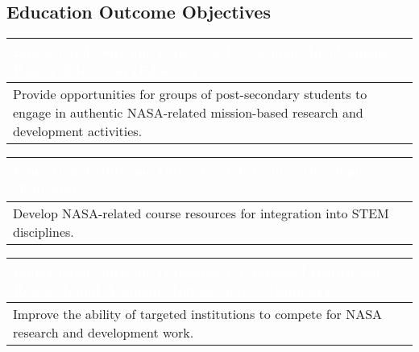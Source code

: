 \documentclass[nocover]            %
{CSLI}                       %
\begin{document}
\subsection{Education Outcome Objectives}

\begin{table}[H]
\centering
\begin{tabular}{| p{\textwidth} |}
\arrayrulecolor{white}
\hline
\rowcolor{gray!80}
\textcolor{white}{\textbf{Educational Outcome Objective 1.3: Student Involvement, Higher Education (Educate) }} \\ \hline
\rowcolor{gray!10}
Provide opportunities for groups of post-secondary students to engage in authentic NASA-related mission-based research and development activities.\\ \hline
\end{tabular}
\end{table} 

\begin{table}[H]
\centering
\begin{tabular}{| p{\textwidth} |}
\arrayrulecolor{white}
\hline
\rowcolor{gray!80}
\textcolor{white}{\textbf{Educational Outcome Objective 1.4: Course Development (Educate)}} \\ \hline
\rowcolor{gray!10}
Develop NASA-related course resources for integration into STEM disciplines.\\ \hline
\end{tabular}
\end{table} 

\begin{table}[H]
\centering
\begin{tabular}{| p{\textwidth} |}
\arrayrulecolor{white}
\hline
\rowcolor{gray!80}
\textcolor{white}{\textbf{Educational Outcome Objective 1.5 Targeted Institution Research and Academic Infrastructure (Employ)}} \\ \hline
\rowcolor{gray!10}
Improve the ability of targeted institutions to compete for NASA research and development work.\\ \hline
\end{tabular}
\end{table}  
\end{document}
